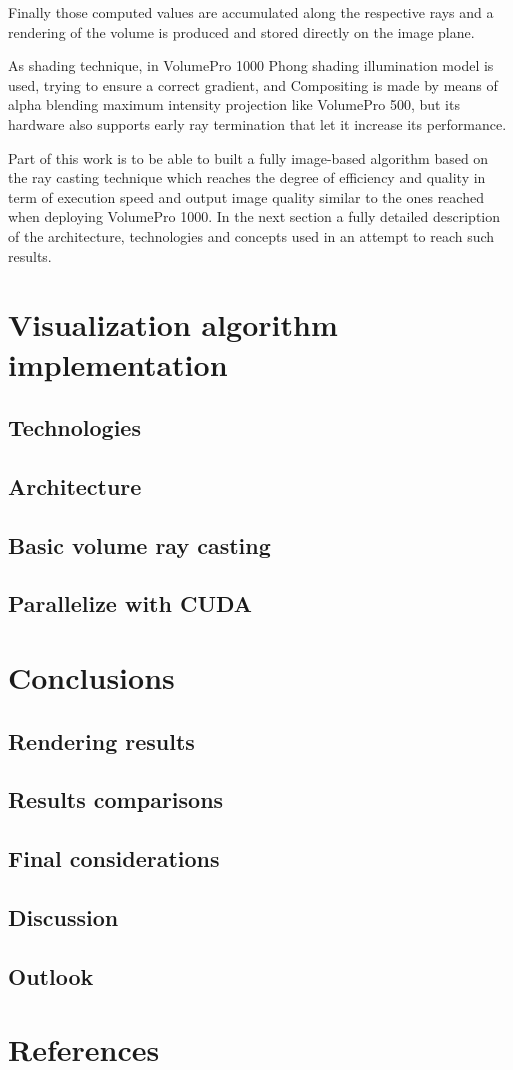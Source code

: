 \documentclass[12pt,a4paper]{extarticle}
\newcommand{\linespace}{\vspace{8pt}}
\begin{document}
Finally those computed values are accumulated along the respective rays and a rendering of the volume is produced and stored directly on the image plane.
\linespace

As shading technique, in VolumePro 1000  Phong shading illumination model is used, trying to ensure a correct gradient, and Compositing is made by means of alpha blending maximum intensity projection like  VolumePro 500, but its hardware also supports early ray termination that let it increase  its performance.

\linespace
Part of this work is to be able to built a fully image-based algorithm based on the ray casting technique which reaches the degree of efficiency and quality in term of execution speed and output image quality similar to the ones reached when deploying VolumePro 1000. In the next section a fully detailed description of the architecture, technologies and concepts used in an attempt to reach such results.
\pagebreak
\section{Visualization algorithm implementation} 
\subsection{Technologies} 
\subsection{Architecture} 
\subsection{Basic volume ray casting} 
\subsection{Parallelize with CUDA} 
\section{Conclusions} 
\subsection{Rendering results} 
\subsection{Results comparisons} 
\subsection{Final considerations} 
\subsection{Discussion} 
\subsection{Outlook}
\section*{References}
\nocite{*}
\end{document}
